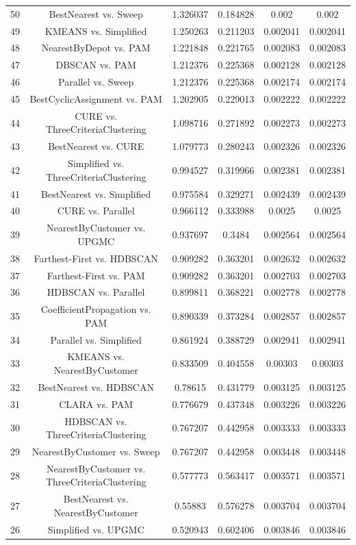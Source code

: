 \documentclass[a4paper,10pt]{article}
\begin{document}
\begin{landscape}
\begin{table}[!htp]
\begin{tabular}{cccccc}
50&BestNearest vs. Sweep&1.326037&0.184828&0.002&0.002\\
49&KMEANS vs. Simplified&1.250263&0.211203&0.002041&0.002041\\
48&NearestByDepot vs. PAM&1.221848&0.221765&0.002083&0.002083\\
47&DBSCAN vs. PAM&1.212376&0.225368&0.002128&0.002128\\
46&Parallel vs. Sweep&1.212376&0.225368&0.002174&0.002174\\
45&BestCyclicAssignment vs. PAM&1.202905&0.229013&0.002222&0.002222\\
44&CURE vs. ThreeCriteriaClustering&1.098716&0.271892&0.002273&0.002273\\
43&BestNearest vs. CURE&1.079773&0.280243&0.002326&0.002326\\
42&Simplified vs. ThreeCriteriaClustering&0.994527&0.319966&0.002381&0.002381\\
41&BestNearest vs. Simplified&0.975584&0.329271&0.002439&0.002439\\
40&CURE vs. Parallel&0.966112&0.333988&0.0025&0.0025\\
39&NearestByCustomer vs. UPGMC&0.937697&0.3484&0.002564&0.002564\\
38&Farthest-First vs. HDBSCAN&0.909282&0.363201&0.002632&0.002632\\
37&Farthest-First vs. PAM&0.909282&0.363201&0.002703&0.002703\\
36&HDBSCAN vs. Parallel&0.899811&0.368221&0.002778&0.002778\\
35&CoefficientPropagation vs. PAM&0.890339&0.373284&0.002857&0.002857\\
34&Parallel vs. Simplified&0.861924&0.388729&0.002941&0.002941\\
33&KMEANS vs. NearestByCustomer&0.833509&0.404558&0.00303&0.00303\\
32&BestNearest vs. HDBSCAN&0.78615&0.431779&0.003125&0.003125\\
31&CLARA vs. PAM&0.776679&0.437348&0.003226&0.003226\\
30&HDBSCAN vs. ThreeCriteriaClustering&0.767207&0.442958&0.003333&0.003333\\
29&NearestByCustomer vs. Sweep&0.767207&0.442958&0.003448&0.003448\\
28&NearestByCustomer vs. ThreeCriteriaClustering&0.577773&0.563417&0.003571&0.003571\\
27&BestNearest vs. NearestByCustomer&0.55883&0.576278&0.003704&0.003704\\
26&Simplified vs. UPGMC&0.520943&0.602406&0.003846&0.003846\\

\end{tabular}
\end{table}
\end{landscape}
\end{document}
